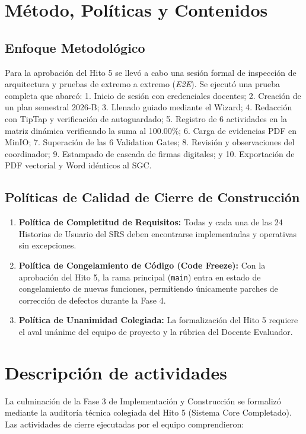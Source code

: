 \documentclass[12pt,a4paper]{article}
\begin{document}
\section{Método, Políticas y Contenidos}
\subsection{Enfoque Metodológico}
Para la aprobación del Hito 5 se llevó a cabo una sesión formal de inspección de arquitectura y pruebas de extremo a extremo (\textit{E2E}). Se ejecutó una prueba completa que abarcó: 1. Inicio de sesión con credenciales docentes; 2. Creación de un plan semestral 2026-B; 3. Llenado guiado mediante el Wizard; 4. Redacción con TipTap y verificación de autoguardado; 5. Registro de 6 actividades en la matriz dinámica verificando la suma al 100.00\%; 6. Carga de evidencias PDF en MinIO; 7. Superación de las 6 Validation Gates; 8. Revisión y observaciones del coordinador; 9. Estampado de cascada de firmas digitales; y 10. Exportación de PDF vectorial y Word idénticos al SGC.

\subsection{Políticas de Calidad de Cierre de Construcción}
\begin{enumerate}[leftmargin=1.5em, itemsep=2pt]
    \item \textbf{Política de Completitud de Requisitos:} Todas y cada una de las 24 Historias de Usuario del SRS deben encontrarse implementadas y operativas sin excepciones.
    \item \textbf{Política de Congelamiento de Código (Code Freeze):} Con la aprobación del Hito 5, la rama principal (\texttt{main}) entra en estado de congelamiento de nuevas funciones, permitiendo únicamente parches de corrección de defectos durante la Fase 4.
    \item \textbf{Política de Unanimidad Colegiada:} La formalización del Hito 5 requiere el aval unánime del equipo de proyecto y la rúbrica del Docente Evaluador.
\end{enumerate}

\section{Descripción de actividades}
La culminación de la Fase 3 de Implementación y Construcción se formalizó mediante la auditoría técnica colegiada del Hito 5 (Sistema Core Completado). Las actividades de cierre ejecutadas por el equipo comprendieron:
\end{document}
